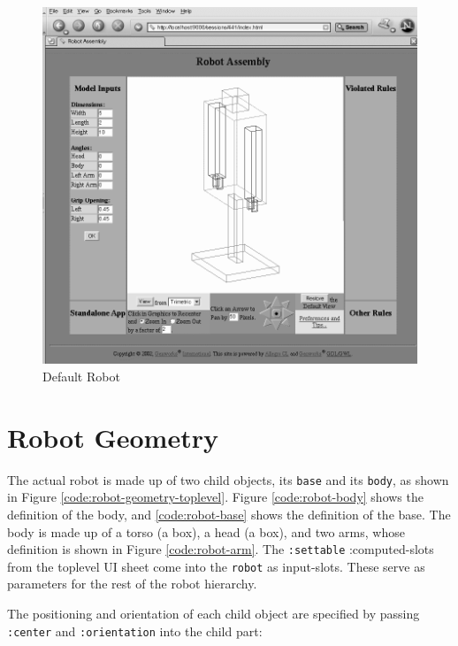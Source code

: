 \documentclass [11pt]{book}
\begin{document}
\begin{figure}
\begin{center}
\includegraphics{../images/robot.png}
\end{center}

\caption{Default Robot}

\label{fig:robot}

\end{figure}


\section{Robot Geometry}

\label{sec:robotgeometry}

The actual robot is made up of two child objects, its \texttt{base} and its \texttt{body}, as shown in Figure 
\ref{code:robot-geometry-toplevel}. Figure 
\ref{code:robot-body} shows the definition of the body, and 
\ref{code:robot-base} shows the definition of the base. The body is made
up of a torso (a box), a head (a box), and two arms, whose
definition is shown in Figure 
\ref{code:robot-arm}. The \texttt{:settable} :computed-slots from the toplevel UI sheet come into the \texttt{robot} as input-slots. These serve as parameters for the rest of the robot hierarchy.

The positioning and orientation of each child object are specified by 
passing \texttt{:center} and \texttt{:orientation} into the child part:
\end{document}
